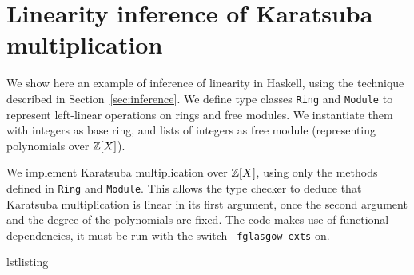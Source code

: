 \chapter{Linearity inference of Karatsuba multiplication}
\label{cha:line-infer-karats}

\lstset{language=haskell}

We show here an example of inference of linearity in Haskell, using
the technique described in Section~\ref{sec:inference}. We define type
classes \lstinline{Ring} and \lstinline{Module} to represent
left-linear operations on rings and free modules. We instantiate them
with integers as base ring, and lists of integers as free module
(representing polynomials over $\mathbb{Z}[X]$).

We implement Karatsuba multiplication over $\mathbb{Z}[X]$, using only the
methods defined in \lstinline{Ring} and \lstinline{Module}. This
allows the type checker to deduce that Karatsuba multiplication is
linear in its first argument, once the second argument and the degree
of the polynomials are fixed. The code makes use of functional
dependencies, it must be run with the switch \verb|-fglasgow-exts| on.

\begin{xcomment}{lstlisting}

\end{xcomment}


                  

%
